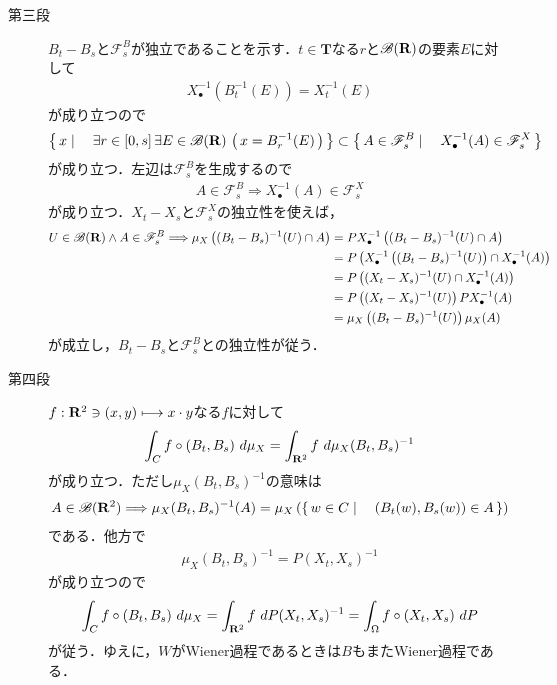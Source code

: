 \begin{sketch}
\begin{description}
			\item[第三段]
				$B_t - B_s$と$\mathscr{F}_s^B$が独立であることを示す．$t \in \mathbf{T}$なる$r$と$\mathscr{B}(\mathbf{R})$の要素$E$に対して
				\begin{align}
					X_\bullet^{-1}(B_t^{-1}(E)) = X_t^{-1}(E)
				\end{align}
				が成り立つので
				\begin{align}
					\left\{\, x \mid \quad \exists r \in [0,s]\, \exists E \in \mathscr{B}(\mathbf{R})\, \left(\, x=B_r^{-1}(E)\, \right)\, \right\}
					\subset \left\{\, A \in \mathscr{F}_s^B \mid \quad X_\bullet^{-1}(A) \in \mathscr{F}^X_s\, \right\}
				\end{align}
				が成り立つ．左辺は$\mathscr{F}_s^B$を生成するので
				\begin{align}
					A \in \mathscr{F}_s^B \Longrightarrow X_\bullet^{-1}(A) \in \mathscr{F}^X_s
				\end{align}
				が成り立つ．$X_t-X_s$と$\mathscr{F}^X_s$の独立性を使えば，
				\begin{align}
					U \in \mathscr{B}(\mathbf{R}) \wedge A \in \mathscr{F}_s^B \Longrightarrow
					\mu_X\left((B_t-B_s)^{-1}(U) \cap A\right)
					&= P X_\bullet^{-1}\left((B_t-B_s)^{-1}(U) \cap A\right) \\
					&= P \left( X_\bullet^{-1}\left((B_t-B_s)^{-1}(U)\right) \cap X_\bullet^{-1}(A)\right) \\
					&= P \left( (X_t-X_s)^{-1}(U) \cap X_\bullet^{-1}(A)\right) \\
					&= P \left( (X_t-X_s)^{-1}(U) \right) P X_\bullet^{-1}(A) \\
					&= \mu_X\left((B_t-B_s)^{-1}(U) \right) \mu_X(A)
				\end{align}
				が成立し，$B_t-B_s$と$\mathscr{F}^B_s$との独立性が従う．
				
			\item[第四段]
				$f:\mathbf{R}^2 \ni (x,y) \longmapsto x \cdot y$なる$f$に対して
				\begin{align}
					\int_C f \circ (B_t,B_s)\ d\mu_X = 
					\int_{\mathbf{R}^2} f\ d\mu_X(B_t,B_s)^{-1}
				\end{align}
				が成り立つ．ただし$\mu_X(B_t,B_s)^{-1}$の意味は
				\begin{align}
					A \in \mathscr{B}(\mathbf{R}^2) \Longrightarrow
					\mu_X(B_t,B_s)^{-1}(A) = \mu_X\left(\left\{\, w \in C \mid \quad (B_t(w),B_s(w)) \in A\, \right\} \right)
				\end{align}
				である．他方で
				\begin{align}
					\mu_X(B_t,B_s)^{-1} = P (X_t,X_s)^{-1}
				\end{align}
				が成り立つので
				\begin{align}
					\int_C f \circ (B_t,B_s)\ d\mu_X = 
					\int_{\mathbf{R}^2} f\ dP(X_t,X_s)^{-1}
					= \int_\Omega f \circ (X_t,X_s)\ dP
				\end{align}
				が従う．ゆえに，$W$がWiener過程であるときは$B$もまたWiener過程である．
				\QED
		\end{description}
	\end{sketch}